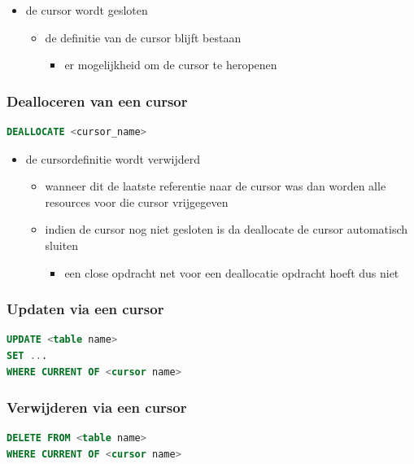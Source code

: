 \documentclass[a4paper,12pt]{article}
\begin{document}
\begin{itemize}
\item de cursor wordt gesloten
	\begin{itemize}
	\item de definitie van de cursor blijft bestaan
		\begin{itemize}
		\item er mogelijkheid om de cursor te heropenen
		\end{itemize}
	\end{itemize}
\end{itemize}

\subsubsection{Dealloceren van een cursor}
\begin{lstlisting}[language=sql, breaklines=true]
DEALLOCATE <cursor_name>
\end{lstlisting}


\begin{itemize}
\item de cursordefinitie wordt verwijderd
	\begin{itemize}
	\item wanneer dit de laatste referentie naar de cursor was dan worden alle resources voor die cursor vrijgegeven
	\item indien de cursor nog niet gesloten is da deallocate de cursor automatisch sluiten
		\begin{itemize}
		\item een close opdracht net voor een deallocatie opdracht hoeft dus niet
		\end{itemize}
	\end{itemize}
\end{itemize}

\subsubsection{Updaten via een cursor}
\begin{lstlisting}[language=sql, breaklines=true]
UPDATE <table name>
SET ...
WHERE CURRENT OF <cursor name>
\end{lstlisting}

\subsubsection{Verwijderen via een cursor}
\begin{lstlisting}[language=sql, breaklines=true]
DELETE FROM <table name>
WHERE CURRENT OF <cursor name>
\end{lstlisting}
\end{document}
